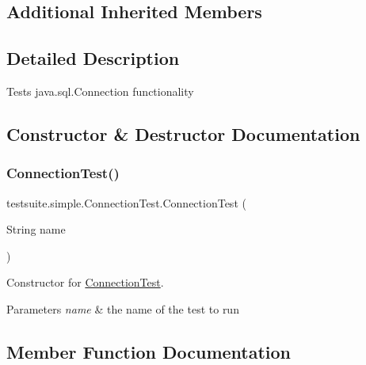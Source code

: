 \subsection*{Additional Inherited Members}


\subsection{Detailed Description}
Tests java.\+sql.\+Connection functionality 

\subsection{Constructor \& Destructor Documentation}
\mbox{\label{classtestsuite_1_1simple_1_1_connection_test_acee3750bd5fb78ce7006ff31f5740a48}} 
\subsubsection{\texorpdfstring{Connection\+Test()}{ConnectionTest()}}
{\footnotesize\ttfamily testsuite.\+simple.\+Connection\+Test.\+Connection\+Test (\begin{DoxyParamCaption}\item[{String}]{name }\end{DoxyParamCaption})}

Constructor for \mbox{\hyperlink{classtestsuite_1_1simple_1_1_connection_test}{Connection\+Test}}.


\begin{DoxyParams}{Parameters}
{\em name} & the name of the test to run \\
\hline
\end{DoxyParams}


\subsection{Member Function Documentation}
\mbox{\label{classtestsuite_1_1simple_1_1_connection_test_a3f457b435e6cf75f31649400f2ce211d}} 
